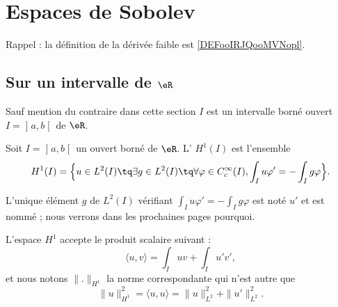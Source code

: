 
\section{Espaces de Sobolev}

Rappel : la définition de la dérivée faible est \ref{DEFooIRJQooMVNopl}.

\subsection{Sur un intervalle de \( \eR\)}

Sauf mention du contraire dans cette section \( I\) est un intervalle borné ouvert \( I=\mathopen] a , b \mathclose[\) de \( \eR\).

\begin{definition}
	Soit \( I=\mathopen] a , b \mathclose[\) un ouvert borné de \( \eR\). L' \( H^1(I)\) est l'ensemble
	\begin{equation}
		H^1(I)=\Big\{   u\in L^2(I)\tq\exists g\in L^2(I)\tq\forall \varphi\in  C^{\infty}_c(I),\int_Iu\varphi'=-\int_Ig\varphi   \Big\}.
	\end{equation}
\end{definition}

L'unique élément \( g\) de \( L^2(I)\) vérifiant \( \int_Iu\varphi'=-\int_Ig\varphi\) est noté \( u'\) et est nommé ; nous verrons dans les prochaines pages pourquoi.

L'espace \( H^1\) accepte le produit scalaire suivant :
\begin{equation}
	\langle u, v\rangle =\int_Iuv+\int_Iu'v',
\end{equation}
et nous notons \( \| . \|_{H^1}\) la norme correspondante qui n'est autre que
\begin{equation}
	\| u \|^2_{H^1}=\langle u, u\rangle =\| u \|^2_{L^2}+\| u' \|^2_{L^2}.
\end{equation}

